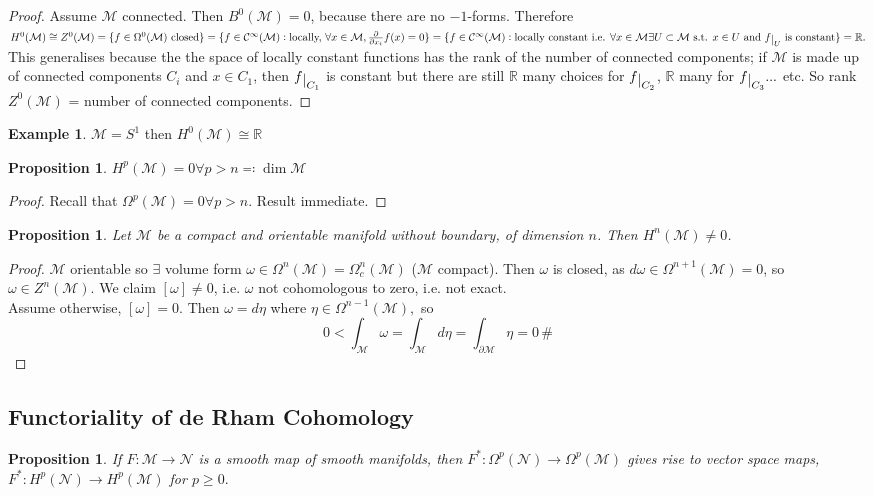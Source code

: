 \documentclass[10pt]{article}
\theoremstyle{plain}
\newtheorem{prop}[thm]{Proposition}
\theoremstyle{definition}
\newtheorem{exmp}[thm]{Example} %
\newcommand{\myand}{\text{ and }}
\newcommand{\st}{\text{ s.t. }}
\newcommand{\Real}{\mathbb{R}}
\newcommand{\man}{\mathcal{M}}
\newcommand{\nan}{\mathcal{N}}
\newcommand{\pformman}[1]{\Omega^{#1}(\man)}
\newcommand{\pformnan}[1]{\Omega^{#1}(\nan)}
\newcommand{\compactpformman}[1]{\Omega^{#1}_c(\man)}
\newcommand{\iparderiv}[1]{\frac{\partial}{\partial x_{#1}}}
\newcommand{\deriv}{d}
\newcommand{\dw}{d\omega}
\newcommand{\cts}[1]{\mathcal{C}^{\infty}(#1)}
\def\restrict#1{\raise-.5ex\hbox{\ensuremath|}_{#1}}
\newcommand{\cohomman}[1]{H^{#1}(\man)}
\newcommand{\coZman}[1]{Z^{#1}(\man)}
\newcommand{\cohomnan}[1]{H^{#1}(\nan)}
\newcommand{\mysubsection}[1]{
    \subsection{#1}
}
\begin{document}
\begin{proof}
Assume $\man$ connected. Then $B^0(\man) = 0$, because there are no $-1$-forms. Therefore $\cohomman{0} \cong \coZman{0} = \{f\in \pformman{0} \text{ closed}\} = \{f\in\cts{\man} : \text{locally, } \forall x\in \man, \iparderiv{i}{} f(x) = 0\} = \{f\in\cts{\man} : \text{locally constant i.e. } \forall x \in \man \exists U\subset \man \st x \in U \myand f\restrict{U} \text{ is constant}\} = \Real.$\\
This generalises because the the space of locally constant functions has the rank of the number of connected components; if $\man$ is made up of connected components $C_i$ and $x\in C_1$, then $f\restrict{C_1}$ is constant but there are still $\Real$ many choices for $f\restrict{C_2}$, $\Real$ many for $f\restrict{C_3} ...$ etc. So rank $\coZman{0}$ = number of connected components.
\end{proof}
\begin{exmp}
$\man = S^1$ then $\cohomman{0} \cong \Real$
\end{exmp}
\begin{prop}
$\cohomman{p} = 0 \forall p > n \eqqcolon \dim \man$
\end{prop}
\begin{proof}
Recall that $\pformman{p} = 0 \forall p > n.$ Result immediate.
\end{proof}
\begin{prop}
Let $\man$ be a compact and orientable manifold without boundary, of dimension $n$. Then $\cohomman{n} \neq 0$.
\end{prop}
\begin{proof}
$\man$ orientable so $\exists $ volume form $\omega \in \pformman{n} = \compactpformman{n}$ ($\man$ compact). Then $\omega$ is closed, as $\dw \in \pformman{n+1} = 0$, so $\omega \in \coZman{n}$. We claim $[\omega] \neq 0$, i.e. $\omega$ not cohomologous to zero, i.e. not exact. \\Assume otherwise, $[\omega] = 0$. Then $\omega = \deriv \eta$ where $\eta \in \pformman{n-1},$ so
$$0< \int_\man \omega = \int_\man \deriv \eta = \int_{\partial \man} \eta = 0\,\#$$
\end{proof}
\mysubsection{Functoriality of de Rham Cohomology}
\begin{prop}

If $F: \man \to \nan $ is a smooth map of smooth manifolds, then $F^*: \pformnan{p} \to \pformman{p}$ gives rise to vector space maps, $F^*: \cohomnan{p} \to \cohomman{p}$ for $p\geq 0.$
\end{prop}
\end{document}
